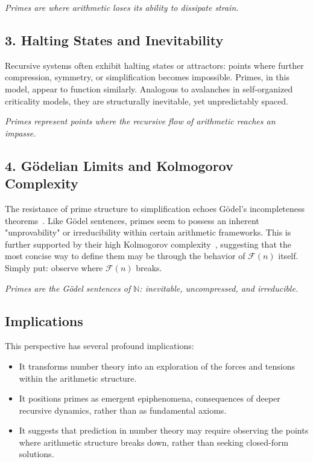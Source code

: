 \documentclass[11pt]{article}
\begin{document}
\textit{Primes are where arithmetic loses its ability to dissipate strain.}

\subsection*{3. Halting States and Inevitability}

Recursive systems often exhibit halting states or attractors: points where further compression, symmetry, or simplification becomes impossible. Primes, in this model, appear to function similarly. Analogous to avalanches in self-organized criticality models, they are structurally inevitable, yet unpredictably spaced.



\textit{Primes represent points where the recursive flow of arithmetic reaches an impasse.}

\subsection*{4. Gödelian Limits and Kolmogorov Complexity}

The resistance of prime structure to simplification echoes Gödel's incompleteness theorems~\cite{godel}. Like Gödel sentences, primes seem to possess an inherent "unprovability" or irreducibility within certain arithmetic frameworks. This is further supported by their high Kolmogorov complexity~\cite{kolmogorov}, suggesting that the most concise way to define them may be through the behavior of $\mathcal{F}(n)$ itself. Simply put: observe where $\mathcal{F}(n)$ breaks.

\textit{Primes are the Gödel sentences of $\mathbb{N}$: inevitable, uncompressed, and irreducible.}

\subsection*{Implications}

This perspective has several profound implications:

\begin{itemize}
  \item It transforms number theory into an exploration of the forces and tensions within the arithmetic structure. 
  \item It positions primes as emergent epiphenomena, consequences of deeper recursive dynamics, rather than as fundamental axioms.
  \item It suggests that prediction in number theory may require observing the points where arithmetic structure breaks down, rather than seeking closed-form solutions. 
\end{itemize}
\end{document}
